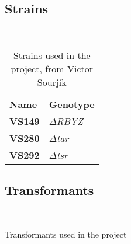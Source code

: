\documentclass[../main.tex]{subfiles}
\begin{document}
\subsection{Strains}
~
\begin{table}[h!]
\begin{center}
\begin{tabular}{ll}
\textbf{Name}	&	\textbf{Genotype}	\\
\textbf{VS149}	&	\textit{$\Delta$RBYZ}	\\
\textbf{VS280}	&	\textit{$\Delta$tar}	\\
\textbf{VS292}	&	\textit{$\Delta$tsr}	
\end{tabular}
\caption[Strains]{Strains used in the project, from Victor Sourjik}
\end{center}
\end{table}

\subsection{Transformants}
~
\begin{table}[h!]
\begin{center}
\caption[Transformants]{Transformants used in the project}
\label{tbl:klstrains}
\end{center}
\end{table}
\end{document}
